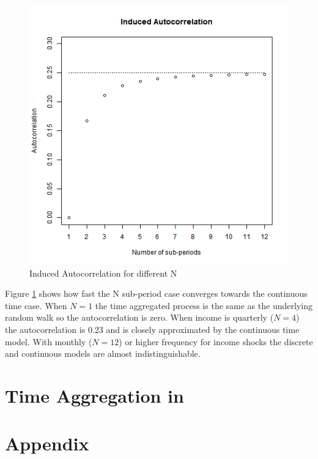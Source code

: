 \documentclass[titlepage]{\econtex}\newcommand{\texname}{BPP_TimeAgg}
\begin{document}
\begin{figure}
	\caption{Induced Autocorrelation for different N}
	\label{fig:InducedAutocorrelation}
	\includegraphics[width=1\textwidth]{../Code/Figures/InducedAutocorrelation.png}
\end{figure}
Figure \ref{fig:InducedAutocorrelation} shows how fast the N sub-period case converges towards the continuous time case. When $N=1$ the time aggregated process is the same as the underlying random walk so the autocorrelation is zero. When income is quarterly ($N=4$) the autocorrelation is 0.23 and is closely approximated by the continuous time model. With monthly ($N=12$) or higher frequency for income shocks the discrete and continuous models are almost indistinguishable. 

\section{Time Aggregation in \cite{blundell_consumption_2008}} \label{BPP}


\processdelayedfloats

\small

\normalsize

\pagebreak
\appendix

\section*{Appendix}
\end{document}
